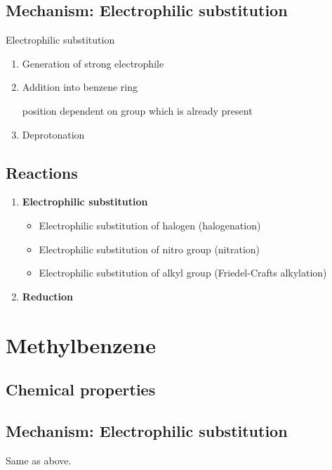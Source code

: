 \documentclass[12pt,a4 paper]{article}
\begin{document}
\subsection{Mechanism: Electrophilic substitution}
\begin{mechanism}{Electrophilic substitution}{}

\begin{enumerate}[leftmargin=0.65in,label=\textbf{Step \arabic*:}]
\item Generation of strong electrophile
\item Addition into benzene ring

position dependent on group which is already present

\item Deprotonation
\end{enumerate}
\end{mechanism}

\subsection{Reactions}
\begin{enumerate}
\item \textbf{Electrophilic substitution}
	\begin{itemize}
	\item Electrophilic substitution of halogen (halogenation)
	\item Electrophilic substitution of nitro group (nitration)
	\item Electrophilic substitution of alkyl group (Friedel-Crafts alkylation)
	\end{itemize}
\item \textbf{Reduction}
\end{enumerate}
\pagebreak

\section{Methylbenzene}
\subsection*{Chemical properties}

\subsection{Mechanism: Electrophilic substitution}
Same as above.
\end{document}
